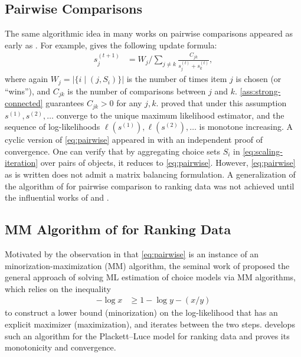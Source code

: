 \subsection{Pairwise Comparisons}
The same algorithmic idea in many works on pairwise comparisons appeared as early as \citet{zermelo1929berechnung}. For example,
\citet{dykstra1956note} gives the following update formula: 
\begin{align}
\label{eq:pairwise}
s_{j}^{(t+1)} & =W_{j}/\sum_{j\neq k}\frac{C_{jk}}{s_{j}^{(t)}+s_{k}^{(t)}},
\end{align}
 where again $W_{j}=|\{i\mid (j,S_i)\}|$ is the number of times
item $j$ is chosen (or ``wins''), and $C_{jk}$ is the number of comparisons between $j$
and $k$. \cref{ass:strong-connected} guarantees $C_{jk}>0$ for any $j,k$.  \citet{zermelo1929berechnung}
proved that under this assumption
$s^{(1)},s^{(2)},\dots$ converge to the unique maximum likelihood estimator,
and the sequence of log-likelihoods $\ell(s^{(1)}),\ell(s^{(2)}),\dots$
is monotone increasing. A cyclic version of \eqref{eq:pairwise} appeared in \citet{ford1957solution} with an independent proof of convergence. One can verify that by aggregating choice sets $S_i$ in \eqref{eq:scaling-iteration} over pairs of objects, it reduces to \eqref{eq:pairwise}. However, \eqref{eq:pairwise} as is written does not admit a matrix balancing formulation. A generalization of the algorithm of \citet{zermelo1929berechnung,ford1957solution,dykstra1956note} for pairwise comparison to ranking data was not achieved until the influential works of \citet{lange2000optimization} and \citet{hunter2004mm}. 
\subsection{MM Algorithm of \citet{hunter2004mm} for Ranking
Data} 
Motivated by the observation in \citet{lange2000optimization} that \eqref{eq:pairwise} is an instance of an minorization-maximization (MM) algorithm, the seminal work of \citet{hunter2004mm} proposed the general approach of solving ML estimation of choice models via MM algorithms, which relies on the inequality 
\begin{align*}
-\log x & \geq1-\log y-(x/y)
\end{align*}
to construct a lower bound (minorization) on the log-likelihood that has an explicit maximizer (maximization), and iterates between the two steps. \citet{hunter2004mm} develops such an algorithm for the Plackett--Luce
model for ranking data and proves its monotonicity and convergence.


